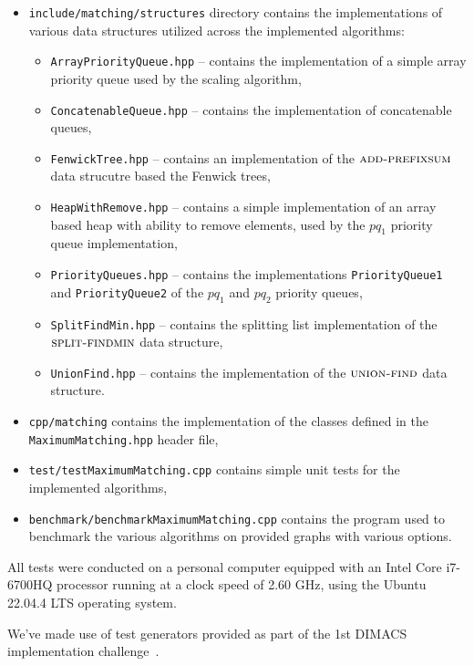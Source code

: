 \begin{itemize}
\begin{itemize}
    \end{itemize}
    \item \texttt{include/matching/structures} directory contains the implementations of various data structures utilized across the implemented algorithms: \begin{itemize}
        \item \texttt{ArrayPriorityQueue.hpp} – contains the implementation of a simple array priority queue used by the scaling algorithm,
        \item \texttt{ConcatenableQueue.hpp} – contains the implementation of concatenable queues,
        \item \texttt{FenwickTree.hpp} – contains an implementation of the $\textsc{add-prefixsum}$ data strucutre based the Fenwick trees,
        \item \texttt{HeapWithRemove.hpp} – contains a simple implementation of an array based heap with ability to remove elements, used by the $pq_1$ priority queue implementation,
        \item \texttt{PriorityQueues.hpp} – contains the implementations \texttt{PriorityQueue1} and \texttt{PriorityQueue2} of the $pq_1$ and $pq_2$ priority queues,
        \item \texttt{SplitFindMin.hpp} – contains the splitting list implementation of the $\textsc{split-findmin}$ data structure,
        \item \texttt{UnionFind.hpp} – contains the implementation of the $\textsc{union-find}$ data structure.
    \end{itemize}
    \item \texttt{cpp/matching} contains the implementation of the classes defined in the \texttt{MaximumMatching.hpp} header file,
    \item \texttt{test/testMaximumMatching.cpp} contains simple unit tests for the implemented algorithms,
    \item \texttt{benchmark/benchmarkMaximumMatching.cpp} contains the program used to benchmark the various algorithms on provided graphs with various options.
\end{itemize}

All tests were conducted on a personal computer equipped with an Intel Core i7-6700HQ processor running at a clock speed of 2.60 GHz, using the Ubuntu 22.04.4 LTS operating system.

We've made use of test generators provided as part of the 1st DIMACS implementation challenge~\cite{rutgersDIMACSImplementation}.

